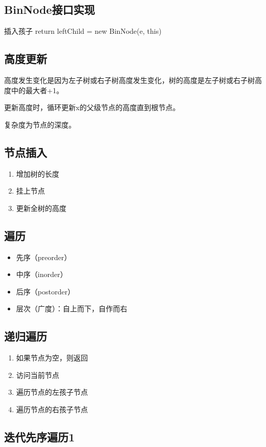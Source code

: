 \documentclass{article}
\begin{document}
\subsection{BinNode接口实现}
插入孩子
return leftChild = new BinNode(e, this)

\subsection{高度更新}
高度发生变化是因为左子树或右子树高度发生变化，树的高度是左子树或右子树高度中的最大者+1。

更新高度时，循环更新x的父级节点的高度直到根节点。

复杂度为节点的深度。

\subsection{节点插入}

\begin{enumerate}
  \item 增加树的长度
  \item 挂上节点
  \item 更新全树的高度
\end{enumerate}

\subsection{遍历}

\begin{itemize}
  \item 先序（preorder）
  \item 中序（inorder）
  \item 后序（postorder）
  \item 层次（广度）：自上而下，自作而右
\end{itemize}

\subsection{递归遍历}
\begin{enumerate}
  \item 如果节点为空，则返回
  \item 访问当前节点
  \item 遍历节点的左孩子节点
  \item 遍历节点的右孩子节点
\end{enumerate}

\subsection{迭代先序遍历1}
\end{document}
